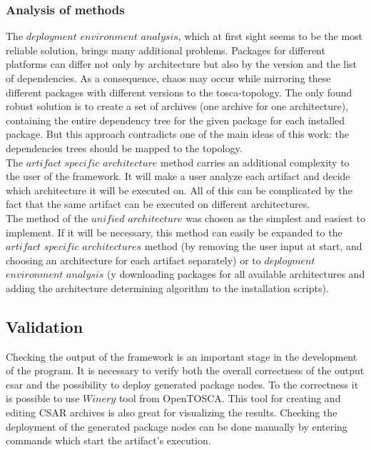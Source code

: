\subsubsection*{Analysis of methods}
The $deployment$ $environment$ $analysis$, which at first sight seems to be the most reliable solution, brings many additional problems.
Packages for different platforms can differ not only by architecture but also by the version and the list of dependencies.
As a consequence, chaos may occur while  mirroring these different packages with different versions to the \gls{tosca}-topology.
The only found robust solution is to create a set of archives (one archive for one architecture), containing the entire dependency tree for the given package for each installed package.
But this approach contradicts one of the main ideas of this work: the dependencies trees should be mapped to the topology.\\
The $artifact$ $specific$ $architecture$ method carries an additional complexity to the user of the framework.
It will make a user analyze each artifact and decide which architecture it will be executed on. 
All of this can be complicated by the fact that the same artifact can be executed on different architectures.\\
The method of the $unified$ $architecture$ was chosen as the simplest and easiest to implement.
If it will be necessary, this method can easily be expanded to the $artifact$ $specific$ $architectures$ method (by removing the user input at start, and choosing an architecture for each artifact separately) or to $deployment$ $environment$ $analysis$ (y downloading packages for all available architectures and adding the architecture determining algorithm to the installation scripts).

%

\subsection{Validation}
Checking the output of the framework is an important stage in the development of the program.
It is necessary to verify both the overall correctness of the output \gls{csar} and the possibility to deploy generated package nodes.
To the correctness it is possible to use $Winery$ tool from OpenTOSCA.
This tool for creating and editing CSAR archives is also great for visualizing the results.
Checking the deployment of the generated package nodes can be done manually by entering commands which start the  artifact's execution.

